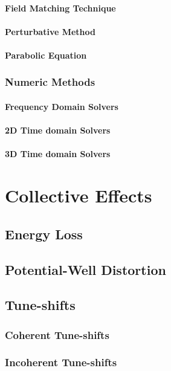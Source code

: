\documentclass[
	12pt,				%
	openright,			%
	oneside,			%
	a4paper,		%
	chapter=TITLE,		%
	section=TITLE,		%
    brazil,				%
	english,			%
	sumario=tradicional,
	]{abntex2}
\begin{document}
      \subsubsection{Field Matching Technique}
      \subsubsection{Perturbative Method}
      \subsubsection{Parabolic Equation}
    \subsection{Numeric Methods}
      \subsubsection{Frequency Domain Solvers}
      \subsubsection{2D Time domain Solvers}
      \subsubsection{3D Time domain Solvers}

\chapter{Collective Effects}
  \section{Energy Loss}
  \section{Potential-Well Distortion}
  \section{Tune-shifts}
    \subsection{Coherent Tune-shifts}
    \subsection{Incoherent Tune-shifts}
\end{document}
